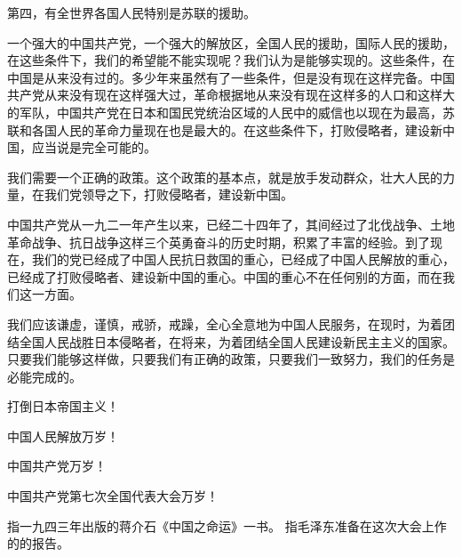 第四，有全世界各国人民特别是苏联的援助。

一个强大的中国共产党，一个强大的解放区，全国人民的援助，国际人民的援助，在这些条件下，我们的希望能不能实现呢？我们认为是能够实现的。这些条件，在中国是从来没有过的。多少年来虽然有了一些条件，但是没有现在这样完备。中国共产党从来没有现在这样强大过，革命根据地从来没有现在这样多的人口和这样大的军队，中国共产党在日本和国民党统治区域的人民中的威信也以现在为最高，苏联和各国人民的革命力量现在也是最大的。在这些条件下，打败侵略者，建设新中国，应当说是完全可能的。

我们需要一个正确的政策。这个政策的基本点，就是放手发动群众，壮大人民的力量，在我们党领导之下，打败侵略者，建设新中国。

中国共产党从一九二一年产生以来，已经二十四年了，其间经过了北伐战争、土地革命战争、抗日战争这样三个英勇奋斗的历史时期，积累了丰富的经验。到了现在，我们的党已经成了中国人民抗日救国的重心，已经成了中国人民解放的重心，已经成了打败侵略者、建设新中国的重心。中国的重心不在任何别的方面，而在我们这一方面。

我们应该谦虚，谨慎，戒骄，戒躁，全心全意地为中国人民服务，在现时，为着团结全国人民战胜日本侵略者，在将来，为着团结全国人民建设新民主主义的国家。只要我们能够这样做，只要我们有正确的政策，只要我们一致努力，我们的任务是必能完成的。

打倒日本帝国主义！

中国人民解放万岁！

中国共产党万岁！

中国共产党第七次全国代表大会万岁！


\begin{maonote}
指一九四三年出版的蒋介石《中国之命运》一书。
指毛泽东准备在这次大会上作的的报告。
\end{maonote}
